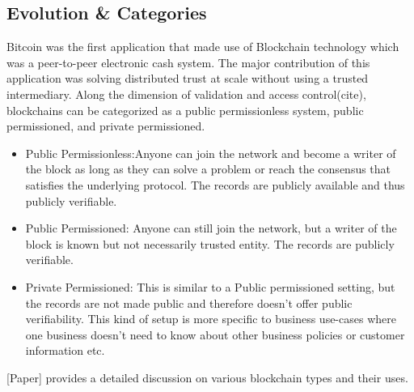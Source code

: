 

\subsection{Evolution \& Categories}
Bitcoin was the first application that made use of Blockchain technology which
was a peer-to-peer electronic cash system. The major contribution of this
application was solving distributed trust at scale without using a trusted
intermediary. 
Along the dimension of validation and access control(cite), blockchains can be
categorized as a public permissionless system, public permissioned, and private
permissioned. 
\begin{itemize}
	\item Public Permissionless:Anyone can join the network and become a writer
		of the block as long as they can solve a problem or reach the consensus
		that satisfies the underlying protocol. The records are publicly
		available and thus publicly verifiable. 
	\item Public Permissioned: Anyone can still join the network, but a writer
		of the block is known but not necessarily trusted entity. The records
		are publicly verifiable. 
	\item Private Permissioned: This is similar to a Public permissioned
		setting, but the records are not made public and therefore doesn't
		offer public verifiability. This kind of setup is more specific to
		business use-cases where one business doesn't need to know about other
		business policies or customer information etc. 
\end{itemize}
[Paper] provides a detailed discussion on various blockchain types and their
uses.


